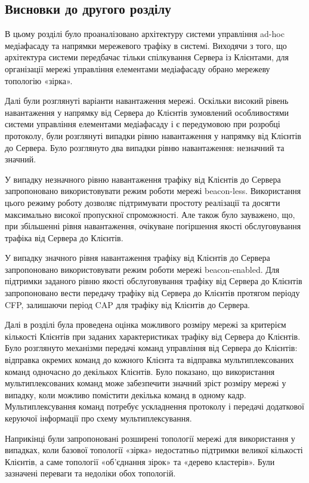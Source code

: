 \documentclass[a4paper,ukrainian,utf8,nocolumnsxix,nocolumnxxxii,nocolumnxxxi,floatsection,equationsection]{eskdtext}
\newcommand{\blm}[0]{beacon-less\xspace}
\newcommand{\bem}[0]{beacon-enabled\xspace}
\begin{document}
\subsection{Висновки до другого розділу}

В цьому розділі було проаналізовано архітектуру системи управління ad-hoc медіафасаду та напрямки мережевого трафіку в системі. Виходячи з того, що архітектура системи передбачає тільки спілкування Сервера із Клієнтами, для організації мережі управління елементами медіафасаду обрано мережеву топологію «зірка».

Далі були розглянуті варіанти навантаження мережі. Оскільки високий рівень навантаження у напрямку від Сервера до Клієнтів зумовлений особливостями системи управління елементами медіафасаду і є передумовою при розробці протоколу, були розглянуті випадки рівню навантаження у напрямку від Клієнтів до Сервера. Було розглянуто два випадки рівню навантаження: незначний та значний.

У випадку незначного рівню навантаження трафіку від Клієнтів до Сервера запропоновано використовувати режим роботи мережі \blm. Використання цього режиму роботу дозволяє підтримувати простоту реалізації та досягти максимально високої пропускної спроможності. Але також було зауважено, що, при збільшенні рівня навантаження, очікуване погіршення якості обслуговування трафіка від Сервера до Клієнтів. 

У випадку значного рівня навантаження трафіку від Клієнтів до Сервера запропоновано використовувати режим роботи мережі \bem. Для підтримки заданого рівню якості обслуговування трафіку від Сервера до Клієнтів запропоновано вести передачу трафіку від Сервера до Клієнтів протягом періоду CFP, залишаючи період CAP для трафіку від Клієнтів до Сервера.

Далі в розділі була проведена оцінка можливого розміру мережі за критерієм кількості Клієнтів при заданих характеристиках трафіку від Сервера до Клієнтів. Було розглянуто механізми передачі команд управління від Сервера до Клієнтів: відправка окремих команд до кожного Клієнта та відправка мультиплексованих команд одночасно до декількох Клієнтів. Було показано, що використання мультиплексованих команд може забезпечити значний зріст розміру мережі у випадку, коли можливо помістити декілька команд в одному кадр. Мультиплексування команд потребує ускладнення протоколу і передачі додаткової керуючої інформації про схему мультиплексування.

Наприкінці були запропоновані розширені топології мережі для використання у випадках, коли базової топології «зірка» недостатньо підтримки великої кількості Клієнтів, а саме топології «об'єднання зірок» та «дерево кластерів». Були зазначені переваги та недоліки обох топологій.
\end{document}
